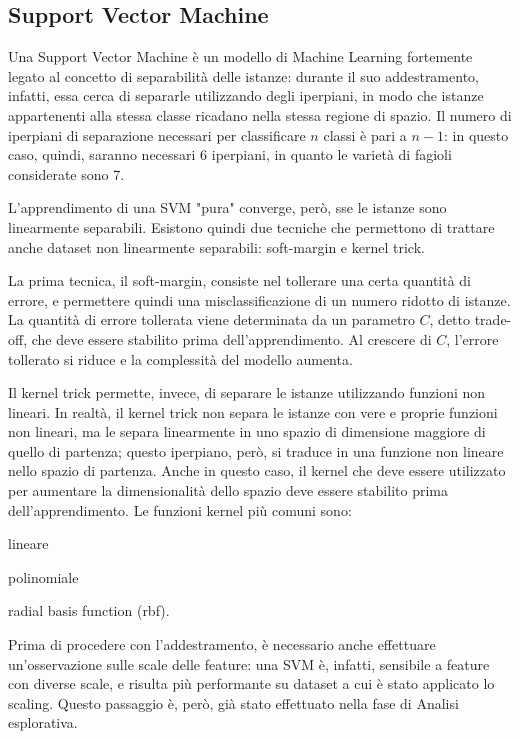 \subsection{Support Vector Machine}
Una Support Vector Machine è un modello di Machine Learning fortemente legato
al concetto di separabilità delle istanze: durante il suo addestramento, infatti,
essa cerca di separarle utilizzando degli iperpiani, in modo che istanze
appartenenti alla stessa classe ricadano nella stessa regione di spazio. 
Il numero di iperpiani di separazione necessari per classificare $n$ classi
è pari a $n-1$: in questo caso, quindi, saranno necessari 6 iperpiani, in quanto
le varietà di fagioli considerate sono 7.

L'apprendimento di una SVM "pura" converge, però, sse le istanze
sono linearmente separabili.
Esistono quindi due tecniche che permettono di trattare anche dataset non linearmente
separabili: soft-margin e kernel trick.

La prima tecnica, il soft-margin, consiste nel tollerare una certa quantità di
errore, e permettere quindi una misclassificazione di un numero ridotto di
istanze. La quantità di errore tollerata viene determinata da un parametro $C$,
detto trade-off, che deve essere stabilito prima dell'apprendimento.
Al crescere di $C$, l'errore tollerato si riduce e la complessità del modello
aumenta.

Il kernel trick permette, invece, di separare le istanze utilizzando funzioni non
lineari. In realtà, il kernel trick non separa le istanze con vere e proprie
funzioni non lineari, ma le separa linearmente in uno spazio di dimensione
maggiore di quello di partenza; questo 
iperpiano, però, si traduce in una funzione non lineare nello spazio di partenza.
Anche in questo caso, il kernel che deve essere utilizzato per aumentare la
dimensionalità dello spazio deve essere stabilito prima dell'apprendimento.
Le funzioni kernel più comuni sono: \begin{itemize*}
    \item lineare
    \item polinomiale
    \item radial basis function (rbf).
\end{itemize*}

Prima di procedere con l'addestramento, è necessario anche effettuare un'osservazione
sulle scale delle feature: una SVM è, infatti, sensibile a feature con diverse scale,
e risulta più performante su dataset a cui è stato applicato lo scaling.
Questo passaggio è, però, già stato effettuato nella fase di Analisi esplorativa.

